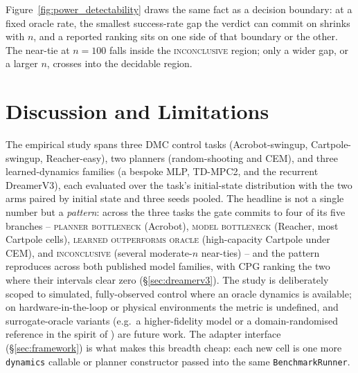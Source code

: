 \documentclass[10pt,letterpaper]{article}
\begin{document}


Figure~\ref{fig:power_detectability} draws the same fact as a decision boundary: at a fixed oracle rate, the smallest success-rate gap the verdict can commit on shrinks with $n$, and a reported ranking sits on one side of that boundary or the other. The near-tie at $n = 100$ falls inside the \textsc{inconclusive} region; only a wider gap, or a larger $n$, crosses into the decidable region.

\section{Discussion and Limitations}

The empirical study spans three DMC control tasks (Acrobot-swingup, Cartpole-swingup, Reacher-easy), two planners (random-shooting and CEM), and three learned-dynamics families (a bespoke MLP, TD-MPC2, and the recurrent DreamerV3), each evaluated over the task's initial-state distribution with the two arms paired by initial state and three seeds pooled. The headline is not a single number but a \emph{pattern}: across the three tasks the gate commits to four of its five branches -- \textsc{planner bottleneck} (Acrobot), \textsc{model bottleneck} (Reacher, most Cartpole cells), \textsc{learned outperforms oracle} (high-capacity Cartpole under CEM), and \textsc{inconclusive} (several moderate-$n$ near-ties) -- and the pattern reproduces across both published model families, with CPG ranking the two where their intervals clear zero (\S\ref{sec:dreamerv3}). The study is deliberately scoped to simulated, fully-observed control where an oracle dynamics is available; on hardware-in-the-loop or physical environments the metric is undefined, and surrogate-oracle variants (e.g.\ a higher-fidelity model or a domain-randomised reference in the spirit of \citet{tobin2017domain}) are future work. The adapter interface (\S\ref{sec:framework}) is what makes this breadth cheap: each new cell is one more \texttt{dynamics} callable or planner constructor passed into the same \texttt{BenchmarkRunner}.
\end{document}
